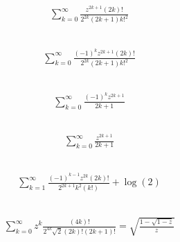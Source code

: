 \documentclass[12pt]{article}
\begin{document}
\subsection{}
\begin{align*}
\sum_{k=0}^{\infty} \frac{z^{2 k + 1} \left(2 k\right)!}{2^{2 k} \left(2 k + 1\right) k!^{2}}
\end{align*}
\vspace{1cm}
\subsection{}
\begin{align*}
\sum_{k=0}^{\infty} \frac{\left(-1\right)^{k} z^{2 k + 1} \left(2 k\right)!}{2^{2 k} \left(2 k + 1\right) k!^{2}}
\end{align*}
\vspace{1cm}
\subsection{}
\begin{align*}
\sum_{k=0}^{\infty} \frac{\left(-1\right)^{k} z^{2 k + 1}}{2 k + 1}
\end{align*}
\vspace{1cm}
\subsection{}
\begin{align*}
\sum_{k=0}^{\infty} \frac{z^{2 k + 1}}{2 k + 1}
\end{align*}
\vspace{1cm}
\subsection{}
\begin{align*}
\sum_{k=1}^{\infty} \frac{\left(-1\right)^{k - 1} z^{2 k} \left(2 k\right)!}{2^{2 k + 1} k^{2}{\left(k! \right)}} + \log{\left(2 \right)}
\end{align*}
\vspace{1cm}
\subsection{}
\begin{align*}
\sum_{k=0}^{\infty} z^{k} \frac{\left(4 k\right)!}{2^{4 k} \sqrt{2} \left(2 k\right)! \left(2 k + 1\right)!} = \sqrt{\frac{1 - \sqrt{1 - z}}{z}}
\end{align*}
\vspace{1cm}
\end{document}
